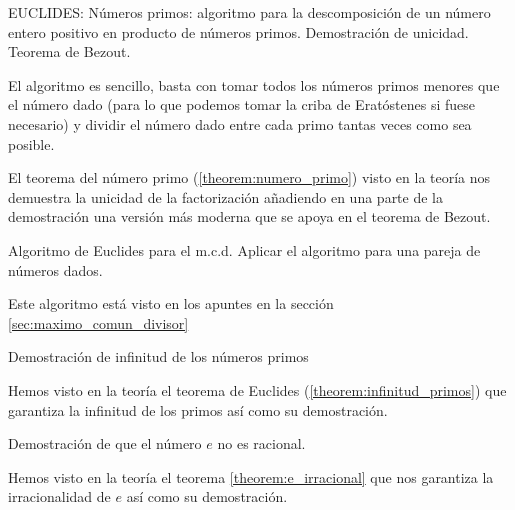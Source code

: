 \begin{problem}[23]
EUCLIDES: Números primos: algoritmo para la descomposición de un número entero positivo en producto de números primos. Demostración de unicidad. Teorema de Bezout.
\solution


El algoritmo es sencillo, basta con tomar todos los números primos menores que el número dado (para lo que podemos tomar la criba de Eratóstenes si fuese necesario) y dividir el número dado entre cada primo tantas veces como sea posible.

El teorema del número primo (\ref{theorem:numero_primo}) visto en la teoría nos demuestra la unicidad de la factorización añadiendo en una parte de la demostración una versión más moderna que se apoya en el teorema de Bezout.

\end{problem}

\begin{problem}[24]
Algoritmo de Euclides para el m.c.d. Aplicar el algoritmo para una pareja de números dados.
\solution

Este algoritmo está visto en los apuntes en la sección \ref{sec:maximo_comun_divisor}

\end{problem}

\begin{problem}[25]
Demostración de infinitud de los números primos
\solution

Hemos visto en la teoría el teorema de Euclides (\ref{theorem:infinitud_primos}) que garantiza la infinitud de los primos así como su demostración.
\end{problem}

\begin{problem}[26]
Demostración de que el número $e$ no es racional.
\solution

Hemos visto en la teoría el teorema \ref{theorem:e_irracional} que nos garantiza la irracionalidad de $e$ así como su demostración.

\end{problem}

